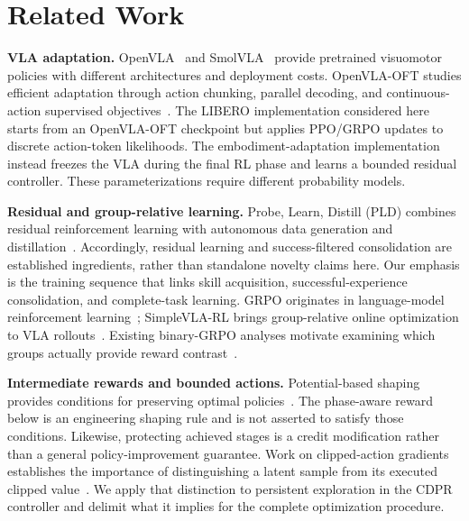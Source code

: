 \section{Related Work}\label{sec:related}
\textbf{VLA adaptation.} OpenVLA~\cite{openvla} and SmolVLA~\cite{smolvla} provide pretrained visuomotor policies with different architectures and deployment costs. OpenVLA-OFT studies efficient adaptation through action chunking, parallel decoding, and continuous-action supervised objectives~\cite{openvlaoft}. The LIBERO implementation considered here starts from an OpenVLA-OFT checkpoint but applies PPO/GRPO updates to discrete action-token likelihoods. The embodiment-adaptation implementation instead freezes the VLA during the final RL phase and learns a bounded residual controller. These parameterizations require different probability models.

\textbf{Residual and group-relative learning.} Probe, Learn, Distill (PLD) combines residual reinforcement learning with autonomous data generation and distillation~\cite{pld}. Accordingly, residual learning and success-filtered consolidation are established ingredients, rather than standalone novelty claims here. Our emphasis is the training sequence that links skill acquisition, successful-experience consolidation, and complete-task learning. GRPO originates in language-model reinforcement learning~\cite{deepseekmath}; SimpleVLA-RL brings group-relative online optimization to VLA rollouts~\cite{simplevlarl}. Existing binary-GRPO analyses motivate examining which groups actually provide reward contrast~\cite{mroueh2026,bay2026}.

\textbf{Intermediate rewards and bounded actions.} Potential-based shaping provides conditions for preserving optimal policies~\cite{ng1999}. The phase-aware reward below is an engineering shaping rule and is not asserted to satisfy those conditions. Likewise, protecting achieved stages is a credit modification rather than a general policy-improvement guarantee. Work on clipped-action gradients establishes the importance of distinguishing a latent sample from its executed clipped value~\cite{capg}. We apply that distinction to persistent exploration in the CDPR controller and delimit what it implies for the complete optimization procedure.
